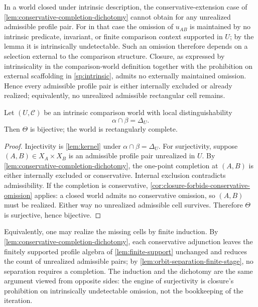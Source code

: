 \begin{corollary}
	\label{cor:closure-forbids-conservative-omission}
	In a world closed under intrinsic description, the conservative-extension
	case of \cref{lem:conservative-completion-dichotomy} cannot obtain for
	any unrealized admissible profile pair. For in that case the omission of
	\(u_{AB}\) is maintained by no intrinsic predicate, invariant, or finite
	comparison context supported in \(U\); by the lemma it is intrinsically
	undetectable. Such an omission therefore depends on a selection external
	to the comparison structure. Closure, as expressed by intrinsicality in
	the comparison-world definition together with the prohibition on
	external scaffolding in \cref{sp:intrinsic}, admits no externally
	maintained omission. Hence every admissible profile pair is either
	internally excluded or already realized; equivalently, no unrealized
	admissible rectangular cell remains.
\end{corollary}
\begin{theorem}
	\label{thm:rectangular-completeness-intrinsicality}
	Let \((U,\mathcal C)\) be an intrinsic comparison world
	with local distinguishability
	\[
		\alpha\cap\beta=\Delta_U.
	\]
	Then \(\Theta\) is bijective; the world is rectangularly complete.
\end{theorem}
\begin{proof}
	Injectivity is \cref{lem:kernel} under
	\(\alpha\cap\beta=\Delta_U\). For surjectivity, suppose
	\((A,B)\in X_A\times X_B\) is an admissible profile pair unrealized in
	\(U\). By \cref{lem:conservative-completion-dichotomy}, the one-point
	completion at \((A,B)\) is either internally excluded or conservative.
	Internal exclusion contradicts admissibility. If the completion is
	conservative, \cref{cor:closure-forbids-conservative-omission} applies:
	a closed world admits no conservative omission, so \((A,B)\) must be
	realized. Either way no unrealized admissible cell survives. Therefore
	\(\Theta\) is surjective, hence bijective.
\end{proof}
\begin{remark}
	Equivalently, one may realize the missing cells by finite induction. By
	\cref{lem:conservative-completion-dichotomy}, each conservative adjunction
	leaves the finitely supported profile algebra of \cref{lem:finite-support}
	unchanged and reduces the count of unrealized admissible pairs; by
	\cref{lem:orbit-separation-finite-stage}, no separation requires a
	completion. The induction and the dichotomy are the same argument viewed
	from opposite sides: the engine of surjectivity is closure's prohibition
	on intrinsically undetectable omission, not the bookkeeping of the
	iteration.
\end{remark}
